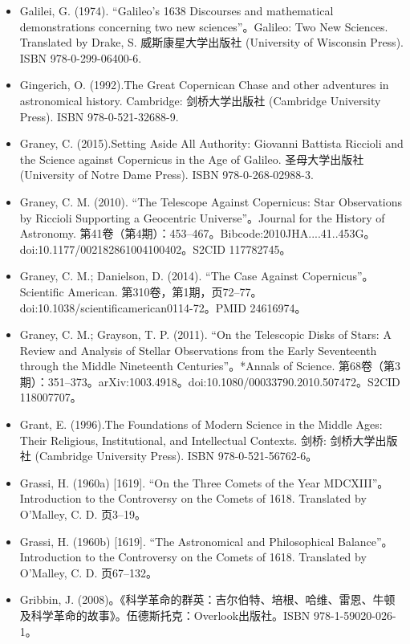 \begin{itemize}
\item Galilei, G. (1974). “Galileo's 1638 Discourses and mathematical demonstrations concerning two new sciences”。Galileo: Two New Sciences. Translated by Drake, S. 威斯康星大学出版社 (University of Wisconsin Press). ISBN 978-0-299-06400-6.  
\item Gingerich, O. (1992).The Great Copernican Chase and other adventures in astronomical history. Cambridge: 剑桥大学出版社 (Cambridge University Press). ISBN 978-0-521-32688-9.  
\item Graney, C. (2015).Setting Aside All Authority: Giovanni Battista Riccioli and the Science against Copernicus in the Age of Galileo. 圣母大学出版社 (University of Notre Dame Press). ISBN 978-0-268-02988-3.
\item Graney, C. M. (2010). “The Telescope Against Copernicus: Star Observations by Riccioli Supporting a Geocentric Universe”。Journal for the History of Astronomy. 第41卷（第4期）：453–467。Bibcode:2010JHA....41..453G。doi:10.1177/002182861004100402。S2CID 117782745。
\item Graney, C. M.; Danielson, D. (2014). “The Case Against Copernicus”。Scientific American. 第310卷，第1期，页72–77。doi:10.1038/scientificamerican0114-72。PMID 24616974。
\item Graney, C. M.; Grayson, T. P. (2011). “On the Telescopic Disks of Stars: A Review and Analysis of Stellar Observations from the Early Seventeenth through the Middle Nineteenth Centuries”。*Annals of Science. 第68卷（第3期）：351–373。arXiv:1003.4918。doi:10.1080/00033790.2010.507472。S2CID 118007707。
\item Grant, E. (1996).The Foundations of Modern Science in the Middle Ages: Their Religious, Institutional, and Intellectual Contexts. 剑桥: 剑桥大学出版社 (Cambridge University Press). ISBN 978-0-521-56762-6。
\item Grassi, H. (1960a) [1619]. “On the Three Comets of the Year MDCXIII”。Introduction to the Controversy on the Comets of 1618. Translated by O'Malley, C. D. 页3–19。
\item Grassi, H. (1960b) [1619]. “The Astronomical and Philosophical Balance”。Introduction to the Controversy on the Comets of 1618. Translated by O'Malley, C. D. 页67–132。
\item Gribbin, J. (2008)。《科学革命的群英：吉尔伯特、培根、哈维、雷恩、牛顿及科学革命的故事》。伍德斯托克：Overlook出版社。ISBN 978-1-59020-026-1。


\end{itemize}
